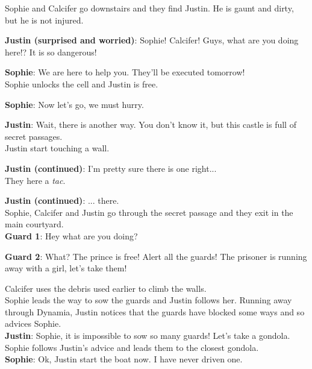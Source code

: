
Sophie and Calcifer go downstairs and they find Justin. He is gaunt and dirty, but he is not injured.

\textbf{Justin (surprised and worried)}: Sophie! Calcifer! Guys, what are you doing here!? It is so dangerous!

\textbf{Sophie}: We are here to help you. They'll be executed tomorrow!\\

Sophie unlocks the cell and Justin is free.

\textbf{Sophie}: Now let's go, we must hurry.

\textbf{Justin}: Wait, there is another way. You don't know it, but this castle is full of secret passages. \\

Justin start touching a wall.

\textbf{Justin (continued)}: I'm pretty sure there is one right... \\

They here a \textit{tac}.

\textbf{Justin (continued)}: ... there. \\

\noindent Sophie, Calcifer and Justin go through the secret passage and they exit in the main courtyard.\\




\textbf{Guard 1}: Hey what are you doing?

\textbf{Guard 2}: What? The prince is free! Alert all the guards! The prisoner is running away with a girl, let's take them!

\noindent Calcifer uses the debris used earlier to climb the walls.\\

\noindent Sophie leads the way to sow the guards and Justin follows her. Running away through Dynamia, Justin notices that the guards have blocked some ways and so advices Sophie.\\

\textbf{Justin}: Sophie, it is impossible to sow so many guards! Let's take a gondola. \\

\noindent Sophie follows Justin's advice and leads them to the closest gondola.\\

\textbf{Sophie}: Ok, Justin start the boat now. I have never driven one.

